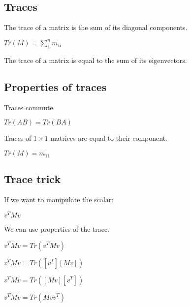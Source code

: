 
\subsection{Traces}

The trace of a matrix is the sum of its diagonal components.

\(Tr(M)=\sum_i^nm_{ii}\)

The trace of a matrix is equal to the sum of its eigenvectors.

\subsection{Properties of traces}

Traces commute

\(Tr(AB)=Tr(BA)\)

Traces of \(1\times 1\) matrices are equal to their component.

\(Tr(M)=m_{11}\)

\subsection{Trace trick}

If we want to manipulate the scalar:

\(v^TMv\)

We can use properties of the trace.

\(v^TMv=Tr(v^TMv)\)

\(v^TMv=Tr([v^T][Mv])\)

\(v^TMv=Tr([Mv][v^T])\)

\(v^TMv=Tr(Mvv^T)\)

